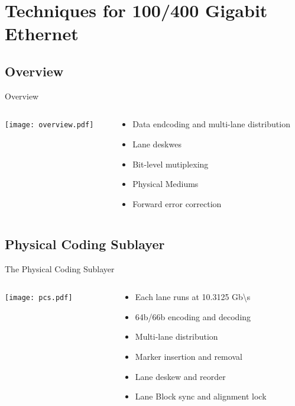 \documentclass[fleqn,11pt,aspectratio=169]{beamer}
\begin{document}
\section{Techniques for 100/400 Gigabit Ethernet}
\subsection{Overview}
\begin{frame}{Overview}
\begin{columns} %
\begin{column}{.6\textwidth}
\texttt{[image: overview.pdf]}
\end{column}
\begin{column}{.4\textwidth}
\begin{itemize}
\item Data endcoding and multi-lane distribution
\item Lane deskwes
\item Bit-level mutiplexing
\item Physical Mediums
\item Forward error correction
\end{itemize}
\end{column}
\end{columns}
\end{frame}

\subsection{Physical Coding Sublayer}
\begin{frame}{The Physical Coding Sublayer}
\begin{columns} %
\begin{column}{.6\textwidth}
\texttt{[image: pcs.pdf]}
\end{column}
\begin{column}{.4\textwidth}
\begin{itemize}
\item Each lane runs at 10.3125 Gb\textbackslash s
\item 64b/66b encoding and decoding
\item Multi-lane distribution
\item Marker insertion and removal
\item Lane deskew and reorder
\item Lane Block sync and alignment lock
\end{itemize}
\end{column}
\end{columns}
\end{frame}
\end{document}
